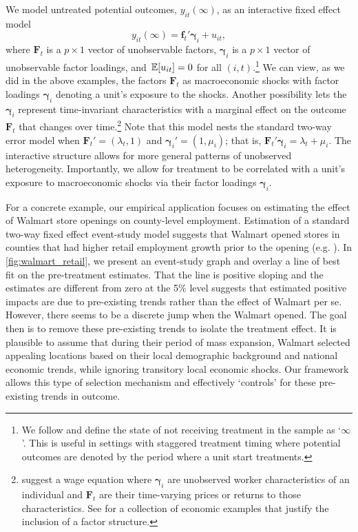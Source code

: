 We model untreated potential outcomes, $y_{it}(\infty)$, as an interactive fixed effect model
\begin{equation}\label{eq:untreated_po}
    y_{it}(\infty) = \bm{f}_t' \bm{\gamma}_i + u_{it},
\end{equation}
where $\bm{F}_t$ is a $p \times 1$ vector of unobservable factors, $\bm \gamma_i$ is a $p \times 1$ vector of unobservable factor loadings, and $\expec{u_{it}} = 0$ for all $(i,t)$.\footnote{We follow \citet{Callaway_Santanna_2021} and define the state of not receiving treatment in the sample as `$\infty$'. This is useful in settings with staggered treatment timing where potential outcomes are denoted by the period where a unit start treatments.} We can view, as we did in the above examples, the factors $\bm{F}_t$ as macroeconomic shocks with factor loadings $\bm \gamma_i$ denoting a unit's exposure to the shocks. Another possibility lets the $\bm \gamma_i$ represent time-invariant characteristics with a marginal effect on the outcome $\bm{F}_t$ that changes over time.\footnote{\citet{Ahn_Lee_Schmidt_2013} suggest a wage equation where $\bm \gamma_i$ are unobserved worker characteristics of an individual and $\bm{F}_t$ are their time-varying prices or returns to those characteristics. See \citet{Bai_2009} for a collection of economic examples that justify the inclusion of a factor structure.} Note that this model nests the standard two-way error model when $\bm{F}_t' = (\lambda_t, 1)$ and $\bm \gamma_i' = (1, \mu_i)$; that is, $\bm{F}_t' \bm \gamma_i = \lambda_t + \mu_i$. The interactive structure allows for more general patterns of unobserved heterogeneity. Importantly, we allow for treatment to be correlated with a unit's exposure to macroeconomic shocks via their factor loadings $\bm{\gamma}_i$. 

For a concrete example, our empirical application focuses on estimating the effect of Walmart store openings on county-level employment. Estimation of a standard two-way fixed effect event-study model suggests that Walmart opened stores in counties that had higher retail employment growth prior to the opening (e.g. \citet{neumark2008effects}). In \autoref{fig:walmart_retail}, we present an event-study graph and overlay a line of best fit on the pre-treatment estimates. That the line is positive sloping and the estimates are different from zero at the 5\% level suggests that estimated positive impacts are due to pre-existing trends rather than the effect of Walmart per se. However, there seems to be a discrete jump when the Walmart opened. The goal then is to remove these pre-existing trends to isolate the treatment effect. It is plausible to assume that during their period of mass expansion, Walmart selected appealing locations based on their local demographic background and national economic trends, while ignoring transitory local economic shocks. Our framework allows this type of selection mechanism and effectively `controls' for these pre-existing trends in outcome.

